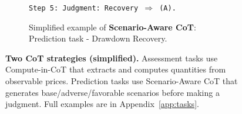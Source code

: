 \begin{figure}[t]
\begin{subfigure}[t]{\textwidth}
\begin{minipage}[c]{0.60\textwidth}
\texttt{\footnotesize Step 5: Judgment: Recovery $\Rightarrow$ (A).}
\end{minipage}
\vspace{-3pt}
\caption{Simplified example of \textbf{Scenario-Aware CoT}: Prediction task - Drawdown Recovery.}
\label{fig:cot_example_scenario}
\end{subfigure}
\vspace{-20pt}
\caption{\textbf{Two CoT strategies (simplified).} Assessment tasks use Compute-in-CoT that extracts and computes quantities from observable prices. Prediction tasks use Scenario-Aware CoT that generates base/adverse/favorable scenarios before making a judgment. Full examples are in Appendix~\ref{app:tasks}.}
\label{fig:cot_examples}
\vspace{-14pt}
\end{figure}
